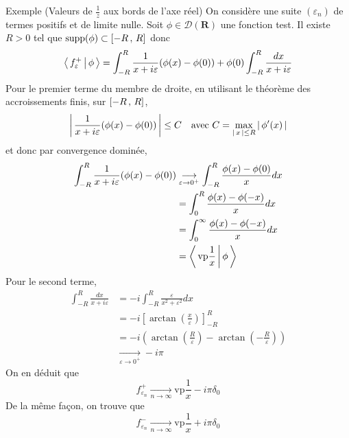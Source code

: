 \begin{demo}{Exemple (Valeurs de $\frac{1}{z}$ aux bords de l’axe réel)}
            On considère une suite $(\varepsilon_n)$ de termes positifs et de limite nulle. Soit $\phi \in \mathcal{D}(\mathbf{R})$ une fonction test. Il existe $R > 0$ tel que $\text{supp}(\phi) \subset \left[ -R \, , \, R \right]$ donc 
            \[ 
                \left< \, f_{\varepsilon}^+ \, \middle| \, \phi \, \right> 
                = \int_{-R}^{R} \frac{1}{x + i\varepsilon}(\phi(x) - \phi(0)) + \phi(0) \int_{-R}^{R} \frac{dx}{x + i \varepsilon} \]   
            Pour le premier terme du membre de droite, en utilisant le théorème des accroissements finis, sur $\left[ -R \, , \, R \right]$,
            \[ \left\lvert \, \frac{1}{x + i \varepsilon}(\phi(x) - \phi(0)) \, \right\rvert \leq C \quad \text{avec } C = \max_{\left\lvert \, x \, \right\rvert \leq R} \left\lvert \, \phi'(x) \, \right\rvert \]   
            et donc par convergence dominée,
            \begin{align*}
                \int_{-R}^{R} \frac{1}{x + i \varepsilon}(\phi(x) - \phi(0)) 
                &\underset{\varepsilon \to 0^+}{\longrightarrow} \int_{-R}^{R} \frac{\phi(x) - \phi(0)}{x}dx \\
                &= \int_{0}^R \frac{\phi(x) - \phi(-x)}{x}dx \\
                &= \int_{0}^{\infty} \frac{\phi(x) - \phi(-x)}{x}dx \\
                &= \left< \, \text{vp}\frac{1}{x} \, \middle| \, \phi \, \right>
            \end{align*}
            Pour le second terme, 
            \begin{align*}
                \int_{-R}^R \frac{dx}{x + i \varepsilon} 
                &= -i \int_{-R}^{R} \frac{\varepsilon}{x^2 + \varepsilon^2} dx \\
                &= -i \left[\arctan\left(\frac{x}{\varepsilon}\right)\right]^{R}_{-R} \\
                &= - i \left(\arctan\left(\frac{R}{\varepsilon}\right) - \arctan\left(-\frac{R}{\varepsilon}\right)\right) \\
                &\underset{\varepsilon \to 0^+}{\longrightarrow} -i \pi
            \end{align*}
            On en déduit que 
            \[ f_{\varepsilon_n}^+ \underset{n \to \infty}{\longrightarrow} \text{vp}\frac{1}{x} - i\pi\delta_0 \]   
            De la même façon, on trouve que 
            \[ f_{\varepsilon_n}^- \underset{n \to \infty}{\longrightarrow} \text{vp}\frac{1}{x} + i\pi\delta_0 \] 
        \end{demo}

